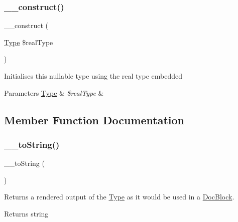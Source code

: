 \subsubsection{\texorpdfstring{\+\_\+\+\_\+construct()}{\_\_construct()}}
{\footnotesize\ttfamily \+\_\+\+\_\+construct (\begin{DoxyParamCaption}\item[{\mbox{\hyperlink{interfacephp_documentor_1_1_reflection_1_1_type}{Type}}}]{\$real\+Type }\end{DoxyParamCaption})}

Initialises this nullable type using the real type embedded


\begin{DoxyParams}[1]{Parameters}
\mbox{\hyperlink{interfacephp_documentor_1_1_reflection_1_1_type}{Type}} & {\em \$real\+Type} & \\
\hline
\end{DoxyParams}


\subsection{Member Function Documentation}
\mbox{\label{classphp_documentor_1_1_reflection_1_1_types_1_1_nullable_a7516ca30af0db3cdbf9a7739b48ce91d}} 
\subsubsection{\texorpdfstring{\+\_\+\+\_\+to\+String()}{\_\_toString()}}
{\footnotesize\ttfamily \+\_\+\+\_\+to\+String (\begin{DoxyParamCaption}{ }\end{DoxyParamCaption})}

Returns a rendered output of the \mbox{\hyperlink{interfacephp_documentor_1_1_reflection_1_1_type}{Type}} as it would be used in a \mbox{\hyperlink{classphp_documentor_1_1_reflection_1_1_doc_block}{Doc\+Block}}.

\begin{DoxyReturn}{Returns}
string 
\end{DoxyReturn}


